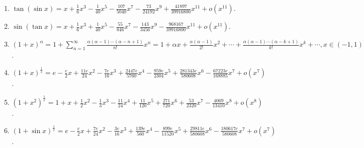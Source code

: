 \documentclass[../../main.tex]{subfiles}
\begin{document}
\begin{enumerate}
\item $\tan(\sin x)=x+\frac{1}{6}x^3-\frac{1}{40}x^5-\frac{107}{5040}x^7-\frac{73}{24192}x^9+\frac{41897}{39916800}x^{11}+o(x^{11})$.
\\
\item $\sin(\tan x)=x+\frac{1}{6}x^3+\frac{1}{40}x^5-\frac{55}{846}x^7-\frac{143}{3456}x^9-\frac{968167}{39916800}x^{11}+o(x^{11})$.
\\
\item $(1+x)^\alpha=1+\sum_{n=1}^{\infty}\frac{\alpha(\alpha-1)\cdots(\alpha-n+1)}{n!}x^n=1+\alpha x+\frac{\alpha(\alpha-1)}{2!}x^2+\cdots+\frac{\alpha(\alpha-1)\cdots(\alpha-k+1)}{k!}x^k+\cdots,x\in(-1,1)$.
\\
\item $(1+x)^{\frac{1}{x}}=e-\frac{e}{2}x+\frac{11e}{24}x^2-\frac{7e}{16}x^3+\frac{2447e}{5760}x^4-\frac{959e}{2304}x^5+\frac{281343e}{580608}x^6-\frac{67223e}{168885}x^7+o(x^7)$.
\\
\item $(1+x^2)^{\frac{1}{x}}=1+x+\frac{1}{2}x^2-\frac{1}{3}x^3-\frac{11}{24}x^4+\frac{11}{120}x^5+\frac{271}{720}x^6+\frac{53}{2320}x^7-\frac{4069}{13410}x^8+o(x^8)$.
\\
\item $(1+\sin x)^{\frac{1}{x}}=e-\frac{e}{2}x+\frac{7e}{24}x^2-\frac{3e}{16}x^3+\frac{139e}{560}x^4-\frac{899e}{11520}x^5+\frac{29811e}{580608}x^6-\frac{180617e}{580608}x^7+o(x^7)$.
\end{enumerate}
\end{document}
